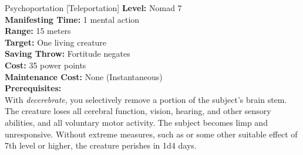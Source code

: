 {Psychoportation [Teleportation]}
{
	\textbf{Level:}
	Nomad 7\\
	\textbf{Manifesting Time:}
	1 mental action\\
	\textbf{Range:}
	15 meters\\
	\textbf{Target:}
	One living creature\\
	\textbf{Saving Throw:}
	Fortitude negates\\
	\textbf{Cost:}
	35 power points\\
	\textbf{Maintenance Cost:}
	None (Instantaneous)\\
	\textbf{Prerequisites:}
	\\
}
{
	With \emph{decerebrate}, you selectively remove a portion of the subject's brain stem. The creature loses all cerebral function, vision, hearing, and other sensory abilities, and all voluntary motor activity. The subject becomes limp and unresponsive. Without extreme measures, such as  or some other suitable effect of 7th level or higher, the creature perishes in 1d4 days.
}
